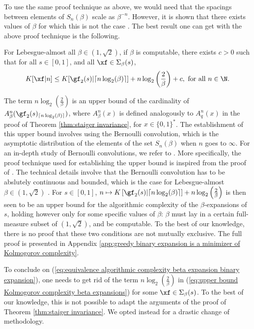 To use the same proof technique as above, we would need that the spacings between elements of $S_n(\beta)$ scale as $\beta^{-n}$. However, it is shown that there exists values of $\beta$ for which this is not the case \cite[Theorem 2.2]{benjamini2008spacings}. The best result one can get with the above proof technique is the following. 
\begin{theorem}\label{thm:upper bound kolmogorov complexity beta expansions}
	For Lebesgue-almost all $\beta \in (1,\sqrt{2})$, if $\beta$ is computable, there exists $c >0$ such that for all $s \in [0,1]$, and all $\xf \in \Sigma_\beta(s)$,
\begin{equation} \label{eq:upper bound Kolmogorov complexity beta expansions}
	K[\xf|n] \leq K[\gf_2(s)|\lceil n \log_2(\beta)\rceil] + n \log_2 \left(\frac{2}{\beta}\right) + c, \ \text{for all} \ n \in \N.
\end{equation}
\end{theorem}
\noindent The term $n\log_2\left(\frac{2}{\beta}\right)$ is an upper bound of the cardinality of $A_\beta^n(\gf_2(s)_{\lceil n \log_2(\beta)\rceil})$, where $A_\beta^n(x)$ is defined analogously to $A_q^n(x)$ in the proof of Theorem \ref{thm:staiger invariance}, for $x \in \{0,1\}^\ast$. The establishment of this upper bound involves using the Bernoulli convolution, which is the asymptotic distribution of the elements of the set $S_n(\beta)$ when $n$ goes to $\infty$. For an in-depth study of Bernoulli convolutions, we refer to \cite{peres2000sixty}. More specifically, the proof technique used for establishing the upper bound is inspired from the proof of \cite[Lemma 3.4]{kempton2013counting}. The technical details involve that the Bernoulli convolution has to be abslutely continuous and bounded, which is the case for Lebesgue-almost $\beta \in (1,\sqrt{2})$ \cite[Corollary 1]{solomyak1995random}. For $s \in [0,1]$, $n \mapsto K\left[\gf_2(s)|\lceil n\log_2(\beta)\rceil\right] + n\log_2\left(\frac{2}{\beta}\right)$ is then seen to be an upper bound for the algorithmic complexity of the $\beta$-expansions of $s$, holding however only for some specific values of $\beta$: $\beta$ must lay in a certain full-measure subset of $(1,\sqrt{2})$, and be computable. To the best of our knowledge, there is no proof that these two conditions are not mutually exclusive. The full proof is presented in Appendix \ref{app:greedy binary expansion is a minimizer of Kolmogorov complexity}.

To conclude on (\ref{eq:equivalence algorithmic complexity beta expansion binary expansion}), one needs to get rid of the term $n\log_2\left(\frac{2}{\beta}\right)$ in (\ref{eq:upper bound Kolmogorov complexity beta expansions}) for some $\xf \in \Sigma_\beta(s)$. To the best of our knowledge, this is not possible to adapt the arguments of the proof of Theorem \ref{thm:staiger invariance}. We opted instead for a drastic change of methodology.

